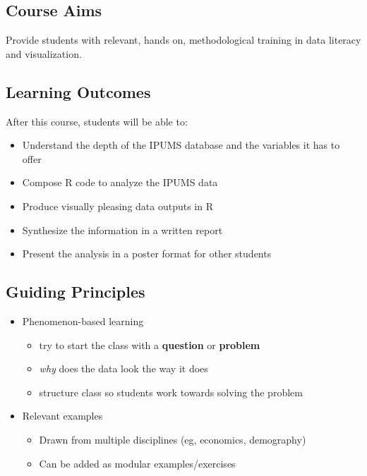 \documentclass[
]{book}
\providecommand{\tightlist}{%
  \setlength{\itemsep}{0pt}\setlength{\parskip}{0pt}}
\begin{document}
\hypertarget{course-aims}{%
\subsection*{Course Aims}\label{course-aims}}

Provide students with relevant, hands on, methodological training in data literacy and visualization.

\hypertarget{learning-outcomes}{%
\subsection*{Learning Outcomes}\label{learning-outcomes}}

After this course, students will be able to:

\begin{itemize}
\tightlist
\item
  Understand the depth of the IPUMS database and the variables it has to\\
  offer
\item
  Compose R code to analyze the IPUMS data
\item
  Produce visually pleasing data outputs in R
\item
  Synthesize the information in a written report
\item
  Present the analysis in a poster format for other students
\end{itemize}

\hypertarget{guiding-principles}{%
\subsection*{Guiding Principles}\label{guiding-principles}}

\begin{itemize}
\tightlist
\item
  Phenomenon-based learning

  \begin{itemize}
  \tightlist
  \item
    try to start the class with a \textbf{question} or \textbf{problem}
  \item
    \emph{why} does the data look the way it does
  \item
    structure class so students work towards solving the problem
  \end{itemize}
\item
  Relevant examples

  \begin{itemize}
  \tightlist
  \item
    Drawn from multiple disciplines (eg, economics, demography)
  \item
    Can be added as modular examples/exercises
  \end{itemize}
\end{itemize}
\end{document}
